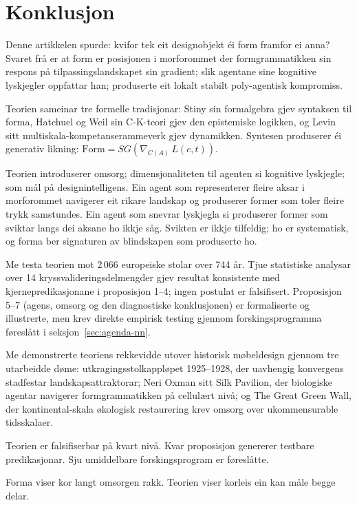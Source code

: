 \section{Konklusjon}
\label{sec:conclusion-nn}

Denne artikkelen spurde: kvifor tek eit designobjekt éi form framfor ei anna? Svaret frå \formlaere{} er at form er posisjonen i morforommet der formgrammatikken sin respons på tilpassingslandskapet sin gradient; slik agentane sine kognitive lyskjegler oppfattar han; produserte eit lokalt stabilt poly-agentisk kompromiss.

Teorien sameinar tre formelle tradisjonar: Stiny sin formalgebra gjev syntaksen til forma, Hatchuel og Weil sin C-K-teori gjev den epistemiske logikken, og Levin sitt multiskala-kompetanserammeverk gjev dynamikken. Syntesen produserer éi generativ likning: $\mathrm{Form} = SG(\nabla_{C(A)}\, L(c,t))$.

Teorien introduserer omsorg; dimensjonaliteten til agenten si kognitive lyskjegle; som mål på designintelligens. Ein agent som representerer fleire aksar i morforommet navigerer eit rikare landskap og produserer former som toler fleire trykk samstundes. Ein agent som snevrar lyskjegla si produserer former som sviktar langs dei aksane ho ikkje såg. Svikten er ikkje tilfeldig; ho er systematisk, og forma ber signaturen av blindskapen som produserte ho.

Me testa teorien mot 2\,066 europeiske stolar over 744 år. Tjue statistiske analysar over 14 kryssvalideringsdelmengder gjev resultat konsistente med kjernepredikasjonane i proposisjon 1--4; ingen postulat er falsifisert. Proposisjon 5--7 (agens, omsorg og den diagnostiske konklusjonen) er formaliserte og illustrerte, men krev direkte empirisk testing gjennom forskingsprogramma føreslått i seksjon~\ref{sec:agenda-nn}.

Me demonstrerte teoriens rekkevidde utover historisk møbeldesign gjennom tre utarbeidde døme: utkragingsstolkappløpet 1925--1928, der uavhengig konvergens stadfestar landskapsattraktorar; Neri Oxman sitt Silk Pavilion, der biologiske agentar navigerer formgrammatikken på cellulært nivå; og The Great Green Wall, der kontinental-skala økologisk restaurering krev omsorg over ukommensurable tidsskalaer.

Teorien er falsifiserbar på kvart nivå. Kvar proposisjon genererer testbare predikasjonar. Sju umiddelbare forskingsprogram er føreslåtte.

Forma viser kor langt omsorgen rakk. Teorien viser korleis ein kan måle begge delar.
